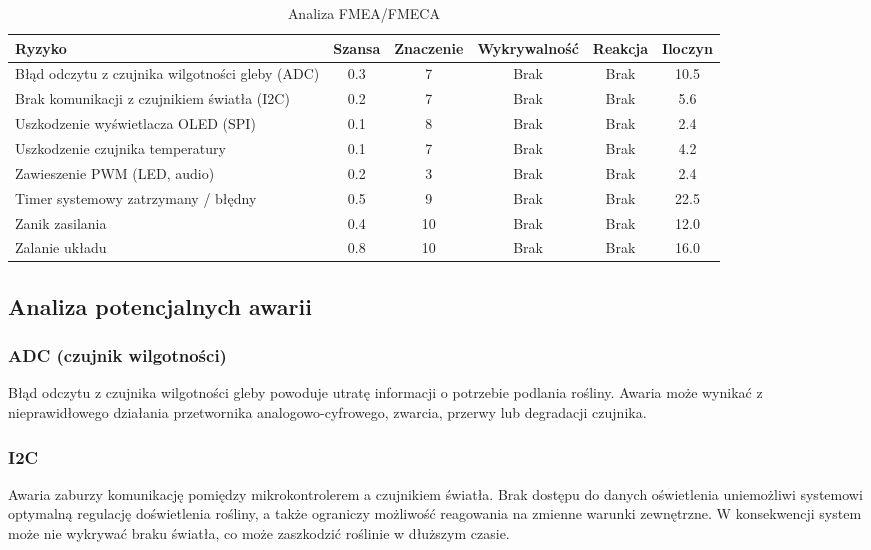 \documentclass{article}
\begin{document}
\begin{table}[H]
    \centering
    \caption{Analiza FMEA/FMECA}
    \renewcommand{\arraystretch}{1.3}
    \begin{tabular}{|p{4.2cm}|c|c|c|c|c|}
    \rowcolor{gray!30}
    \hline
    \textbf{Ryzyko} & \textbf{Szansa} & \textbf{Znaczenie} & \textbf{Wykrywalność} & \textbf{Reakcja} & \textbf{Iloczyn} \\
    \hline
    Błąd odczytu z czujnika wilgotności gleby (ADC) & 0.3 & \cellcolor{yellow!50}7 & Brak & Brak & 10.5 \\
    \hline
    Brak komunikacji z czujnikiem światła (I2C) & 0.2 & \cellcolor{yellow!50}7 &Brak& Brak & 5.6 \\
    \hline
    Uszkodzenie wyświetlacza OLED (SPI) & 0.1 & \cellcolor{yellow!50}8 &Brak & Brak & 2.4 \\
    \hline
    Uszkodzenie czujnika temperatury & 0.1 & \cellcolor{yellow!50}7 & Brak & Brak & 4.2 \\
    \hline
    Zawieszenie PWM (LED, audio) & 0.2 & \cellcolor{green!50}3 & Brak & Brak & 2.4 \\
    \hline
    Timer systemowy zatrzymany / błędny & 0.5 & \cellcolor{red!50}9 & Brak & Brak & 22.5 \\
    \hline
    Zanik zasilania & 0.4 & \cellcolor{red!50}10 & Brak & Brak & 12.0 \\
    \hline
    Zalanie układu & 0.8 & \cellcolor{red!50}10 & Brak & Brak & 16.0 \\
    \hline
    \end{tabular}
\end{table}
    

\subsection{Analiza potencjalnych awarii}

\subsubsection{ADC (czujnik wilgotności)}
Błąd odczytu z czujnika wilgotności gleby powoduje utratę informacji o potrzebie podlania rośliny. Awaria może wynikać z nieprawidłowego działania przetwornika analogowo-cyfrowego, zwarcia, przerwy lub degradacji czujnika.

\subsubsection{I2C}
Awaria zaburzy komunikację pomiędzy mikrokontrolerem a czujnikiem światła. Brak dostępu do danych oświetlenia uniemożliwi systemowi optymalną regulację doświetlenia rośliny, a także ograniczy możliwość reagowania na zmienne warunki zewnętrzne. W konsekwencji system może nie wykrywać braku światła, co może zaszkodzić roślinie w dłuższym czasie. 
\end{document}
